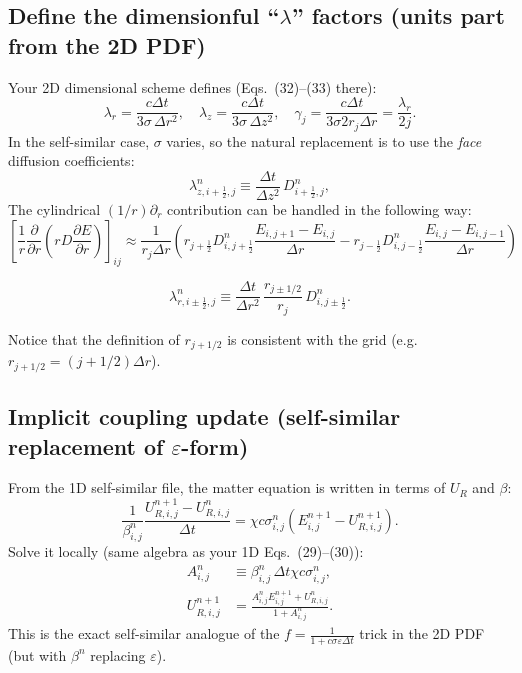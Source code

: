 \documentclass[11pt]{article}
\begin{document}
\subsection{Define the dimensionful ``$\lambda$'' factors (units part from the 2D PDF)}
Your 2D dimensional scheme defines (Eqs.~(32)--(33) there):
\[
\lambda_r=\frac{c\Delta t}{3\sigma\,\Delta r^2},\quad
\lambda_z=\frac{c\Delta t}{3\sigma\,\Delta z^2},\quad
\gamma_j=\frac{c\Delta t}{3\sigma2r_j\Delta r}=\frac{\lambda_r}{2j}.
\]
In the self-similar case, $\sigma$ varies, so the natural replacement is to use the \emph{face} diffusion coefficients:
\begin{equation}
\lambda^{n}_{z,i+\frac12,j} \equiv \frac{\Delta t}{\Delta z^2}\,D^n_{i+\frac12,j},
\label{eq:lambdas_faces}
\end{equation}
The cylindrical $(1/r)\partial_r$ contribution can be handled in the following way:
\begin{equation}
\left[\frac{1}{r}\frac{\partial}{\partial r}\left(r D\frac{\partial E}{\partial r}\right)\right]_{ij}\approx \frac{1}{r_j \Delta r}\left( r_{j+\frac{1}{2}}D_{i,j+\frac{1}{2}}^n \frac{E_{i,j+1}-E_{i,j}}{\Delta r} - r_{j-\frac{1}{2}}D_{i,j-\frac{1}{2}}^n \frac{E_{i,j}-E_{i,j-1}}{\Delta r} \right)
\end{equation}

\begin{equation}
\lambda^{n}_{r,i\pm \frac12,j} \equiv \frac{\Delta t}{\Delta r^2}\,\frac{r_{j\pm 1/2}}{r_j}\,D^n_{i,j\pm\frac12}. \label{eq:lambda_r}
\end{equation}

Notice that the definition of $r_{j+1/2}$ is consistent with the grid (e.g. $r_{j+1/2}=(j+1/2)\Delta r$). 

\subsection{Implicit coupling update (self-similar replacement of $\varepsilon$-form)}
From the 1D self-similar file, the matter equation is written in terms of $U_R$ and $\beta$:
\[
\frac{1}{\beta^n_{i,j}}\frac{U_{R,i,j}^{n+1}-U_{R,i,j}^{n}}{\Delta t}
= \chi c\sigma^n_{i,j}\left(E^{n+1}_{i,j}-U_{R,i,j}^{n+1}\right).
\]
Solve it locally (same algebra as your 1D Eqs.~(29)--(30)):
\begin{align}
A^n_{i,j} &\equiv \beta^n_{i,j}\,\Delta t \chi c\sigma^n_{i,j},\\
U_{R,i,j}^{n+1} &= \frac{A^n_{i,j}E^{n+1}_{i,j}+U^n_{R,i,j}}{1+A^n_{i,j}}. \label{eq:UR_update}
\end{align}
This is the exact self-similar analogue of the $f=\frac{1}{1+c\sigma\varepsilon\Delta t}$ trick in the 2D PDF (but with $\beta^n$ replacing $\varepsilon$).
\end{document}
